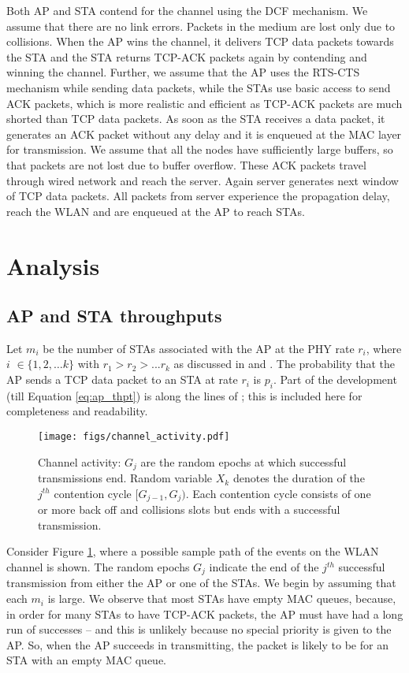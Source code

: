 \documentclass[conference]{IEEEtran}
\begin{document}
Both AP and STA contend for the channel using the DCF mechanism.
We assume that there are no link errors. Packets in the medium are 
lost only due to collisions. When the AP wins the channel, it delivers TCP
data packets towards the STA and the STA returns TCP-ACK packets again by
contending and winning the channel. Further, 
we assume that the AP uses the RTS-CTS mechanism while sending data packets, 
while the STAs use basic access to send ACK packets, which is more realistic 
and efficient as TCP-ACK packets are much shorted than TCP data packets. As 
soon as the STA receives a data packet, it generates an ACK packet without any 
delay and it is enqueued at the MAC layer for transmission. We assume that all 
the nodes have sufficiently large buffers, so that packets are not lost due to 
buffer overflow. These ACK packets travel through wired network and reach the 
server. Again server generates next window of TCP data packets. All packets 
from server experience the propagation delay, reach the WLAN and are enqueued 
at the AP to reach  STAs.
\section{Analysis}\label{sec:Analysis}
\subsection{AP and STA throughputs}
 Let $m_i $ be the number of STAs associated with the AP at 
the PHY rate $r_i$, where $i$ $ \in \lbrace 1,2, \ldots k \rbrace $ with $r_1  
>  r_2  > ... r_k $ as discussed in \cite{astn_model:Krusheel} and \cite
{astn_model:pradeep_kuri}. The probability that the AP sends a TCP data packet 
to an STA at rate $ r_i $ is $ p_i $. Part of the development (till 
Equation \eqref{eq:ap_thpt}) is along the lines of \cite
{astn_model:pradeep_kuri}; this is included here for completeness and readability.
\begin{figure}[h]
\centering
\texttt{[image: figs/channel\_activity.pdf]} 
\caption{ Channel activity: $G_j$ are the random epochs at which successful 
transmissions end. Random variable $X_k$ denotes the duration of the $j^{th}$ 
contention cycle $[G_{j-1}, G_{j}) $. Each contention cycle consists of one or 
more back off and collisions slots but ends with a successful transmission. }
\label{fig:channel_activity}
\end{figure}
Consider Figure \ref{fig:channel_activity}, where a possible sample path of the 
events on the WLAN channel is shown. The random epochs $ G_j $ indicate the end 
of the $ j^{th} $ successful transmission from either the AP or one of the 
STAs. We begin by assuming that each $m_i$ is large. We observe that most 
STAs have empty MAC queues, because, in order for many STAs to have TCP-ACK 
packets, the AP must have had a long run of successes -- and this is unlikely 
because no special priority is given to the AP. So, when the AP succeeds in 
transmitting, the packet is likely to be for an STA with an empty MAC queue.
\end{document}
